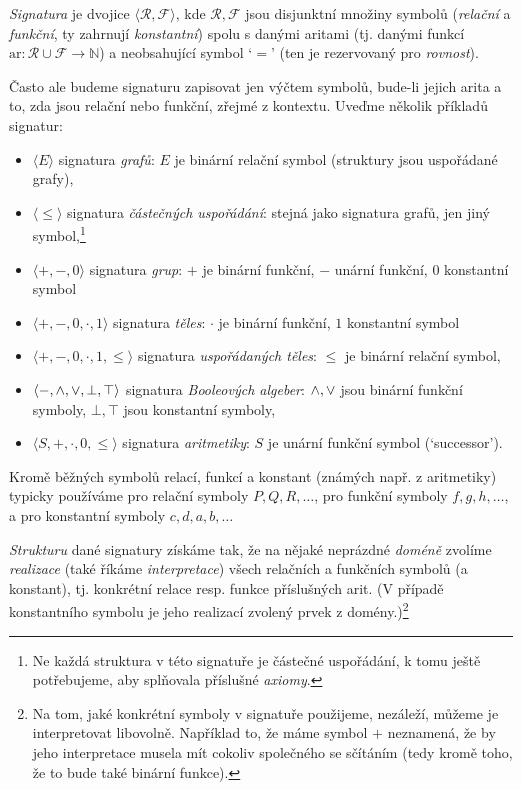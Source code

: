 \begin{definition}
    \emph{Signatura} je dvojice $\langle\mathcal R,\mathcal F\rangle$, kde $\mathcal R,\mathcal F$ jsou disjunktní množiny symbolů (\emph{relační} a \emph{funkční}, ty zahrnují \emph{konstantní}) spolu s danými aritami (tj. danými funkcí $\mathrm{ar}\colon \mathcal R\cup\mathcal F\to\mathbb N$) a neobsahující symbol `$=$' (ten je rezervovaný pro \emph{rovnost}). 
    
\end{definition}

Často ale budeme signaturu zapisovat jen výčtem symbolů, bude-li jejich arita a to, zda jsou relační nebo funkční, zřejmé z kontextu. Uveďme několik příkladů signatur:
\begin{itemize}
    \item $\langle E \rangle$ signatura \emph{grafů}: $E$ je binární relační symbol (struktury jsou uspořádané grafy),
    \item $\langle \leq \rangle$ signatura \emph{částečných uspořádání}: stejná jako signatura grafů, jen jiný symbol,\footnote{Ne každá struktura v této signatuře je částečné uspořádání, k tomu ještě potřebujeme, aby splňovala příslušné \emph{axiomy}.}
    \item $\langle +, -, 0\rangle$ signatura \emph{grup}: $+$ je binární funkční, $-$ unární funkční, $0$ konstantní symbol
    \item $\langle +, -, 0,\cdot,1\rangle$ signatura \emph{těles}: $\cdot$ je binární funkční, $1$ konstantní symbol
    \item $\langle +, -, 0,\cdot,1,\leq\rangle$ signatura \emph{uspořádaných těles}: $\leq$ je binární relační symbol,
    \item $\langle -,{\land},{\lor},\bot,\top\rangle$ signatura \emph{Booleových algeber}: ${\land},{\lor}$ jsou binární funkční symboly, $\bot,\top$ jsou konstantní symboly,
    \item $\langle S,+,\cdot,0,\leq\rangle$ signatura \emph{aritmetiky}: $S$ je unární funkční symbol (`successor').
\end{itemize}
Kromě běžných symbolů relací, funkcí a konstant (známých např. z aritmetiky) typicky používáme pro relační symboly $P,Q,R,\dots$, pro funkční symboly $f,g,h,\dots$, a pro konstantní symboly $c,d,a,b,\dots$

\emph{Strukturu} dané signatury získáme tak, že na nějaké neprázdné \emph{doméně} zvolíme \emph{realizace} (také říkáme \emph{interpretace}) všech relačních a funkčních symbolů (a konstant), tj. konkrétní relace resp. funkce příslušných arit. (V případě konstantního symbolu je jeho realizací zvolený prvek z domény.)\footnote{Na tom, jaké konkrétní symboly v signatuře použijeme, nezáleží, můžeme je interpretovat libovolně. Například to, že máme symbol $+$ neznamená, že by jeho interpretace musela mít cokoliv společného se sčítáním (tedy kromě toho, že to bude také binární funkce).}


